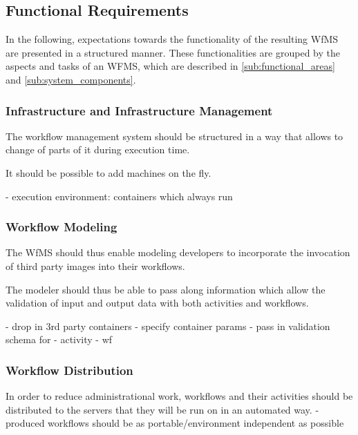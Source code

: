 
\subsection{Functional Requirements} %
  \label{sub:functional_requirements}

  In the following, expectations towards the functionality of the resulting \ac{WfMS} are presented in a structured manner. These functionalities are grouped by the aspects and tasks of an WFMS, which are described in \ref{sub:functional_areas} and \ref{sub:system_components}.

  \subsubsection{Infrastructure and Infrastructure Management} %
    \label{ssub:infrastructure_management}
      The workflow management system should be structured in a way that allows to change of parts of it during execution time.

      It should be possible to add machines on the fly.

      - execution environment: containers which always run



  \subsubsection{Workflow Modeling} %
    \label{ssub:workflow_modeling}

      The \ac{WfMS} should thus enable modeling developers to incorporate the invocation of third party images into their workflows.

      The modeler should thus be able to pass along information which allow the validation of input and output data with both activities and workflows.

        - drop in 3rd party containers
          - specify container params
        - pass in validation schema for
          - activity
          - wf

  \subsubsection{Workflow Distribution} %
    \label{ssub:workflow_distribution}
      In order to reduce administrational work, workflows and their activities should be distributed to the servers that they will be run on in an automated way.
  - produced workflows should be as portable/environment independent as possible

